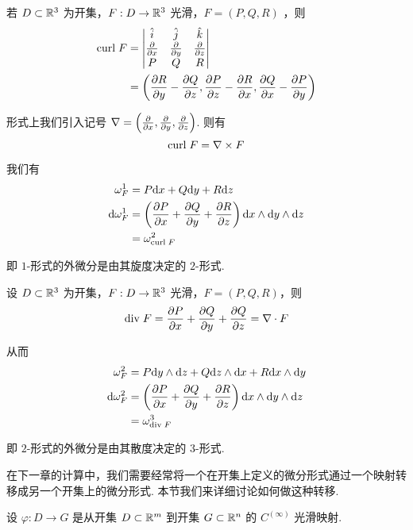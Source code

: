 \begin{example}[ 旋度]
    若 $D\subset\mathbb{R}^3$ 为开集，$F:D\to\mathbb{R}^3$ 光滑，$F=(P,Q,R)$ ，则
$$
\begin{aligned}
\mathrm{curl}\; F&=\begin{vmatrix}
    \hat{i} & \hat{j} & \hat{k}\\
    \frac{\partial{}}{\partial{x}} & \frac{\partial{}}{\partial{y}} & \frac{\partial{}}{\partial{z}}\\
    P & Q & R
\end{vmatrix}\\
&=\left(\frac{\partial{R}}{\partial{y}}-\frac{\partial{Q}}{\partial{z}},\frac{\partial{P}}{\partial{z}}-\frac{\partial{R}}{\partial{x}},\frac{\partial{Q}}{\partial{x}}-\frac{\partial{P}}{\partial{y}}\right)
\end{aligned}
$$

    形式上我们引入记号 $\nabla=\left(\frac{\partial{}}{\partial{x}},\frac{\partial{}}{\partial{y}},\frac{\partial{}}{\partial{z}}\right)$. 则有
$$
\mathrm{curl}\; F=\nabla\times F
$$

    我们有
$$
\begin{aligned}
\omega_F^1&=P\mathrm{d} x+Q\mathrm{d} y+R\mathrm{d} z\\
\mathrm{d}\omega_F^1&=\left(\frac{\partial{P}}{\partial{x}}+\frac{\partial{Q}}{\partial{y}}+\frac{\partial{R}}{\partial{z}}\right)\mathrm{d} x\wedge\mathrm{d} y\wedge\mathrm{d} z\\
&=\omega_{\mathrm{curl}\; F}^2
\end{aligned}
$$

    即 $1$-形式的外微分是由其旋度决定的 $2$-形式.
\end{example}

\begin{example}[ 散度]
    设 $D\subset\mathbb{R}^3$ 为开集，$F:D\to\mathbb{R}^3$ 光滑，$F=(P,Q,R)$，则
$$
\mathrm{div}\; F=\frac{\partial{P}}{\partial{x}}+\frac{\partial{Q}}{\partial{y}}+\frac{\partial{Q}}{\partial{z}}=\nabla\cdot F
$$

    从而
$$
\begin{aligned}
    \omega_{F}^2&=P\mathrm{d} y\wedge\mathrm{d} z+Q\mathrm{d} z\wedge\mathrm{d} x+R\mathrm{d} x\wedge\mathrm{d} y\\
    \mathrm{d}\omega_F^2&=\left(\frac{\partial{P}}{\partial{x}}+\frac{\partial{Q}}{\partial{y}}+\frac{\partial{R}}{\partial{z}}\right)\mathrm{d} x\wedge\mathrm{d} y\wedge\mathrm{d} z\\
    &=\omega_{\mathrm{div}\; F}^3
\end{aligned}
$$

    即 $2$-形式的外微分是由其散度决定的 $3$-形式.
\end{example}


在下一章的计算中，我们需要经常将一个在开集上定义的微分形式通过一个映射转移成另一个开集上的微分形式. 本节我们来详细讨论如何做这种转移.

设 $\varphi:D\to G$ 是从开集 $D\subset\mathbb{R}^m$ 到开集 $G\subset\mathbb{R}^n$ 的 $C^{(\infty)}$ 光滑映射.

